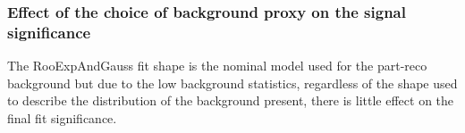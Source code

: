 





\subsubsection{Effect of the choice of background proxy on the signal significance}
\label{subsec:backfit}
The RooExpAndGauss fit shape is the nominal model used for the part-reco background but due to the low background statistics, regardless of the shape used to describe the distribution of the background present, there is little effect on the final fit significance.

